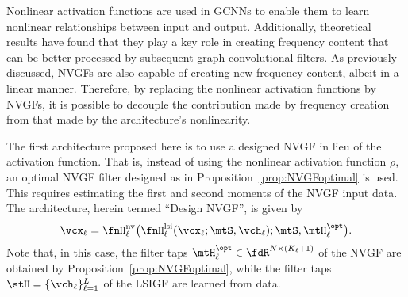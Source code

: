 Nonlinear activation functions are used in GCNNs to enable them to learn nonlinear relationships between input and output. Additionally, theoretical results have found that they play a key role in creating frequency content that can be better processed by subsequent graph convolutional filters. As previously discussed, NVGFs are also capable of creating new frequency content, albeit in a linear manner. Therefore, by replacing the nonlinear activation functions by NVGFs, it is possible to decouple the contribution made by frequency creation from that made by the architecture's nonlinearity.

The first architecture proposed here is to use a designed NVGF in lieu of the activation function. That is, instead of using the nonlinear activation function $\rho$, an optimal NVGF filter designed as in Proposition~\ref{prop:NVGFoptimal} is used. This requires estimating the first and second moments of the NVGF input data. The architecture, herein termed ``Design NVGF'', is given by
\begin{equation} \label{eq:designNVGF}
    \vcx_{\ell} = \fnH_{\ell}^{\text{nv}} \big( \fnH_{\ell}^{\text{lsi}} (\vcx_{\ell}; \mtS, \vch_{\ell}); \mtS, \mtH_{\ell}^{\opt} \big).
\end{equation}
%
Note that, in this case, the filter taps $\mtH_{\ell}^{\opt} \in \fdR^{N \times (K_{\ell}+1)}$ of the NVGF are obtained by Proposition~\ref{prop:NVGFoptimal}, while the filter taps $\stH = \{\vch_{\ell}\}_{\ell=1}^L$ of the LSIGF are learned from data.


